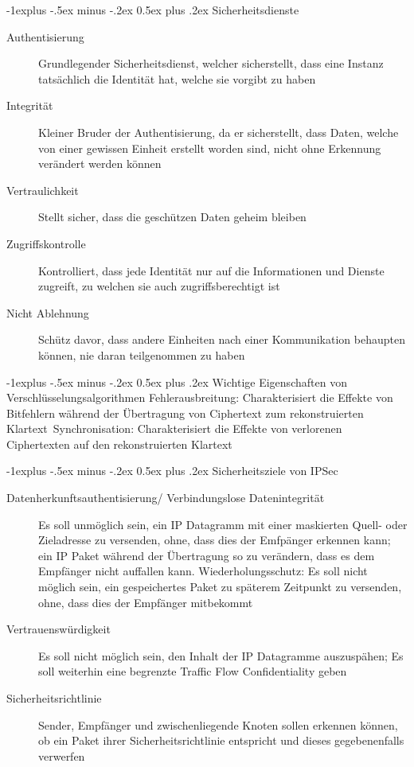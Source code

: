 \documentclass[10pt,landscape]{article}
\makeatletter
\renewcommand{\subsection}{\@startsection{subsection}{2}{0mm}%
                                {-1explus -.5ex minus -.2ex}%
                                {0.5ex plus .2ex}%
                                {\normalfont\normalsize\bfseries}}
\makeatother
\begin{document}
\begin{multicols}{3}
\subsection{Sicherheitsdienste}
\begin{description}
    \item[Authentisierung] Grundlegender Sicherheitsdienst, welcher sicherstellt, dass eine Instanz tatsächlich die Identität hat, welche sie vorgibt zu haben
    \item[Integrität] Kleiner Bruder der Authentisierung, da er sicherstellt, dass Daten, welche von einer gewissen Einheit erstellt worden sind, nicht ohne Erkennung verändert werden können
    \item[Vertraulichkeit] Stellt sicher, dass die geschützen Daten geheim bleiben
    \item[Zugriffskontrolle] Kontrolliert, dass jede Identität nur auf die Informationen und Dienste zugreift, zu welchen sie auch zugriffsberechtigt ist
    \item[Nicht Ablehnung] Schütz davor, dass andere Einheiten nach einer Kommunikation behaupten können, nie daran teilgenommen zu haben
\end{description}

\subsection{Wichtige Eigenschaften von Verschlüsselungsalgorithmen}
Fehlerausbreitung: Charakterisiert die Effekte von Bitfehlern während der Übertragung von Ciphertext zum rekonstruierten Klartext\
Synchronisation: Charakterisiert die Effekte von verlorenen Ciphertexten auf den rekonstruierten Klartext

\subsection{Sicherheitsziele von IPSec}
\begin{description}
    \item[Datenherkunftsauthentisierung/ Verbindungslose Datenintegrität] Es soll unmöglich sein, ein IP Datagramm mit einer maskierten Quell- oder Zieladresse zu versenden, ohne, dass dies der Emfpänger erkennen kann; ein IP Paket während der Übertragung so zu verändern, dass es dem Empfänger nicht auffallen kann. Wiederholungsschutz: Es soll nicht möglich sein, ein gespeichertes Paket zu späterem Zeitpunkt zu versenden, ohne, dass dies der Empfänger mitbekommt
    \item[Vertrauenswürdigkeit] Es soll nicht möglich sein, den Inhalt der IP Datagramme auszuspähen; Es soll weiterhin eine begrenzte Traffic Flow Confidentiality geben
    \item[Sicherheitsrichtlinie] Sender, Empfänger und zwischenliegende Knoten sollen erkennen können, ob ein Paket ihrer Sicherheitsrichtlinie entspricht und dieses gegebenenfalls verwerfen
\end{description}




\end{multicols}
\end{document}
